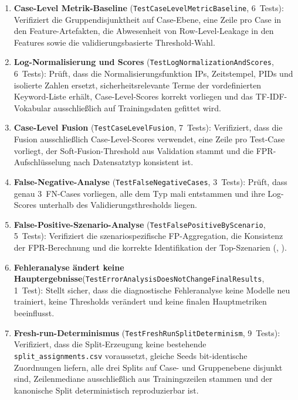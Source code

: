 \begin{enumerate}
  \item \textbf{Case-Level Metrik-Baseline} (\texttt{TestCaseLevelMetricBaseline}, 6~Tests): Verifiziert die Gruppendisjunktheit auf Case-Ebene, eine Zeile pro Case in den Feature-Artefakten, die Abwesenheit von Row-Level-Leakage in den Features sowie die validierungsbasierte Threshold-Wahl.

  \item \textbf{Log-Normalisierung und Scores} (\texttt{TestLogNormalizationAndScores}, 6~Tests): Prüft, dass die Normalisierungsfunktion IPs, Zeitstempel, PIDs und isolierte Zahlen ersetzt, sicherheitsrelevante Terme der vordefinierten Keyword-Liste erhält, Case-Level-Scores korrekt vorliegen und das TF-IDF-Vokabular ausschließlich auf Trainingsdaten gefittet wird.

  \item \textbf{Case-Level Fusion} (\texttt{TestCaseLevelFusion}, 7~Tests): Verifiziert, dass die Fusion ausschließlich Case-Level-Scores verwendet, eine Zeile pro Test-Case vorliegt, der Soft-Fusion-Threshold aus Validation stammt und die FPR-Aufschlüsselung nach Datensatztyp konsistent ist.

  \item \textbf{False-Negative-Analyse} (\texttt{TestFalseNegativeCases}, 3~Tests): Prüft, dass genau 3~FN-Cases vorliegen, alle dem Typ mali entstammen und ihre Log-Scores unterhalb des Validierungsthresholds liegen.

  \item \textbf{False-Positive-Szenario-Analyse} (\texttt{TestFalsePositiveByScenario}, 5~Tests): Verifiziert die szenariospezifische FP-Aggregation, die Konsistenz der FPR-Berechnung und die korrekte Identifikation der Top-Szenarien (, ).

  \item \textbf{Fehleranalyse ändert keine Hauptergebnisse}\newline(\texttt{TestError\-Analysis\-DoesNot\-Change\-Final\-Results}, 1~Test): Stellt sicher, dass die diagnostische Fehleranalyse keine Modelle neu trainiert, keine Thresholds verändert und keine finalen Hauptmetriken beeinflusst.

  \item \textbf{Fresh-run-Determinismus} (\texttt{TestFreshRunSplitDeterminism}, 9~Tests): Verifiziert, dass die Split-Erzeugung keine bestehende \texttt{split\_assignments.csv} voraussetzt, gleiche Seeds bit-identische Zuordnungen liefern, alle drei Splits auf Case- und Gruppenebene disjunkt sind, Zeilenmediane ausschließlich aus Trainingszeilen stammen und der kanonische Split deterministisch reproduzierbar ist.
\end{enumerate}

